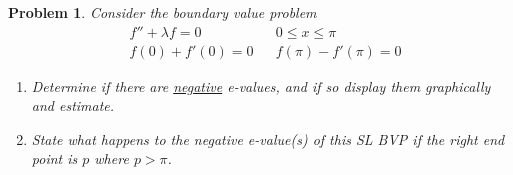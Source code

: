 \documentclass[a4paper,12pt]{article} %
\theoremstyle{plain}
\newtheorem{problem}{Problem}
\begin{document}
\begin{problem} %
    Consider the boundary value problem
    \begin{align*}
    &f'' + \lambda f = 0 &  &0 \leq x \leq \pi \\
    &f(0) + f'(0) = 0 && f(\pi) -f'(\pi) = 0
    \end{align*}
    
    \begin{enumerate}[label=\alph*.)]
        \item Determine if there are \underline{negative} e-values, and if so display them graphically and estimate.
        \item State what happens to the negative e-value(s) of this SL BVP if the right end point is $p$ where $p>\pi$.
    \end{enumerate}
\end{problem}
\end{document}
